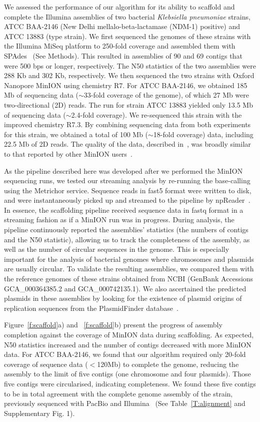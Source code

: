 We assessed the performance of our algorithm for its ability to scaffold and complete the
Illumina assemblies of two bacterial \emph{Klebsiella pneumoniae} strains, ATCC
BAA-2146 (New Delhi mellalo-beta-lactamase (NDM-1) positive)
and ATCC 13883 (type strain).
We first sequenced the genomes of these strains with the Illumina MiSeq platform to 250-fold
coverage and assembled them with SPAdes~\cite{BankevichNA2012}
(See Methods). This resulted in assemblies of 90 and 69 contigs
that were 500 bps or longer, respectively. The N50 statistics of the two
assemblies were 288 Kb and 302 Kb, respectively.
We then sequenced the two strains with Oxford Nanopore MinION using chemistry R7. 
For ATCC BAA-2146, we obtained 185 Mb of sequencing data ($\sim$33-fold
coverage of the genome), of which 27 Mb were two-directional (2D) reads. The run for strain ATCC
13883 yielded only 13.5 Mb of sequencing data ($\sim$2.4-fold coverage). 
We re-sequenced this strain with the improved chemistry R7.3.
By combining sequencing data from both experiments for this strain, we obtained
a total of 100 Mb ($\sim$18-fold coverage) data, including 22.5 Mb of 2D reads.
The quality of the data, described in~\cite{CaoGE2016}, was broadly
similar to that reported by other MinION users~\cite{LomanQ2014, AshtonND2015,
JainFM2015}.

As the pipeline described here was developed after we performed the MinION
sequencing runs, we tested our streaming analysis by re-running the base-calling
using the Metrichor service. Sequence reads in fast5 format were written to disk,
and were instantaneously picked up and streamed to the pipeline by
npReader~\cite{CaoGC2016}. In essence, the scaffolding pipeline received
sequence data in fastq format in a streaming fashion as if a MinION run was
in progress. 
During analysis, the pipeline continuously reported the assemblies'
statistics (the numbers of contigs and the N50 statistic), allowing us to track
the completeness of the assembly, as well as the number of circular sequences in
the genome. This is especially important for the analysis of bacterial genomes
where chromosomes and plasmids are usually circular.
To validate the resulting assemblies, we compared them with the reference
genomes of these strains obtained from NCBI (GenBank Accessions GCA\_000364385.2
and GCA\_000742135.1). We also ascertained the predicted plasmids in these
assemblies by looking for the existence of plasmid origins of replication
sequences from the PlasmidFinder database~\cite{CarattoliZG2014}.


Figure~\ref{f:scaffold}a) and ~\ref{f:scaffold}b) present the progress of 
assembly completion against the coverage of MinION data during scaffolding.
As expected, N50 statistics increased and the number of contigs 
decreased with more MinION data. For \kp{} ATCC BAA-2146, we found that
our algorithm required only 20-fold coverage of sequence data ($<$120Mb) to
complete the genome, reducing the assembly to the limit of five contigs (one
chromosome and four plasmids). Those five contigs were circularised, indicating
completeness. We found these five contigs to be in total agreement
with the complete genome assembly of the strain, previously sequenced with PacBio and
Illumina~\cite{HudsonBM2014} (See Table~\ref{T:alignment} and Supplementary
Fig. 1).


